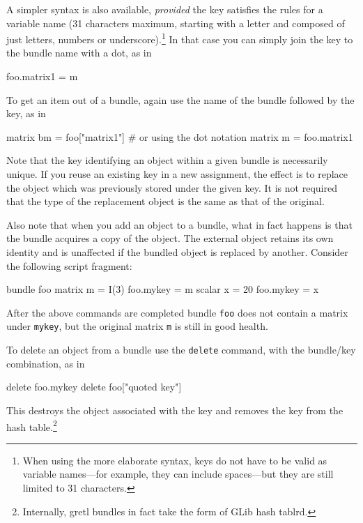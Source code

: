 A simpler syntax is also available, \emph{provided} the key satisfies
the rules for a  variable name (31 characters maximum,
starting with a letter and composed of just letters, numbers or
underscore).\footnote{When using the more elaborate syntax, keys do
  not have to be valid as variable names---for example, they can
  include spaces---but they are still limited to 31 characters.}  In
that case you can simply join the key to the bundle name with a dot,
as in

\begin{code}
foo.matrix1 = m
\end{code}

To get an item out of a bundle, again use the name of the bundle
followed by the key, as in

\begin{code}
matrix bm = foo["matrix1"]
# or using the dot notation
matrix m = foo.matrix1
\end{code}

Note that the key identifying an object within a given bundle is
necessarily unique. If you reuse an existing key in a new assignment,
the effect is to replace the object which was previously stored under
the given key. It is not required that the type of the replacement
object is the same as that of the original.

Also note that when you add an object to a bundle, what in fact
happens is that the bundle acquires a copy of the object. The external
object retains its own identity and is unaffected if the bundled
object is replaced by another. Consider the following script fragment:

\begin{code}
bundle foo
matrix m = I(3)
foo.mykey = m
scalar x = 20
foo.mykey = x
\end{code}

After the above commands are completed bundle \texttt{foo} does not
contain a matrix under \texttt{mykey}, but the original matrix
\texttt{m} is still in good health.

To delete an object from a bundle use the \texttt{delete} command,
with the bundle/key combination, as in

\begin{code}
delete foo.mykey
delete foo["quoted key"]
\end{code}

This destroys the object associated with the key and removes the key
from the hash table.\footnote{Internally, gretl bundles in fact take
  the form of \textsf{GLib} hash tablrd.}

